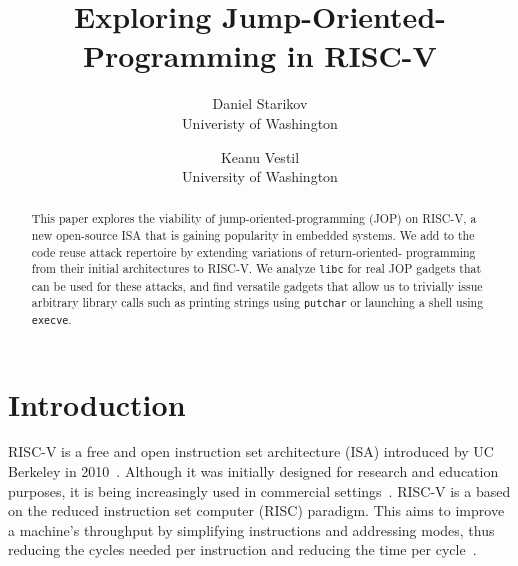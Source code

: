 

\date{}

\title{\Large \bf Exploring Jump-Oriented-Programming in RISC-V}

\author{
{\rm Daniel Starikov}\\
Univeristy of Washington
\and
{\rm Keanu Vestil}\\
University of Washington
} %

\maketitle

\begin{abstract}
This paper explores the viability of jump-oriented-programming (JOP) on RISC-V,
a new open-source ISA that is gaining popularity in embedded systems. We add to
the code reuse attack repertoire by extending variations of return-oriented-%
programming from their initial architectures to RISC-V. We analyze \verb|libc|
for real JOP gadgets that can be used for these attacks, and find versatile
gadgets that allow us to trivially issue arbitrary library calls such as
printing strings using \verb|putchar| or launching a shell using \verb|execve|.
\end{abstract}


\section{Introduction}

RISC-V is a free and open instruction set architecture (ISA) introduced by UC
Berkeley in 2010~\cite{riscvmanual}. Although it was initially designed for research and education
purposes, it is being increasingly used in commercial settings~\cite{riscvgrowth}. RISC-V is a
based on the reduced instruction set computer (RISC) paradigm. This aims to
improve a machine's throughput by simplifying instructions and addressing modes,
thus reducing the cycles needed per instruction and reducing the time per cycle~\cite{patterson98risc}.

